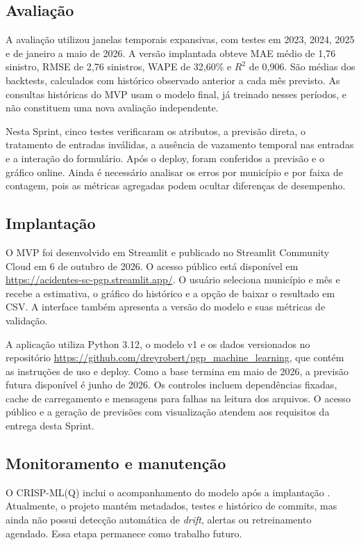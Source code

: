 \documentclass[12pt]{article}
\begin{document}
\subsection{Avaliação}

A avaliação utilizou janelas temporais expansivas, com testes em 2023, 2024, 2025 e de janeiro a maio de 2026. A versão implantada obteve MAE médio de 1,76 sinistro, RMSE de 2,76 sinistros, WAPE de 32,60\% e $R^2$ de 0,906. São médias dos backtests, calculados com histórico observado anterior a cada mês previsto. As consultas históricas do MVP usam o modelo final, já treinado nesses períodos, e não constituem uma nova avaliação independente.

Nesta Sprint, cinco testes verificaram os atributos, a previsão direta, o tratamento de entradas inválidas, a ausência de vazamento temporal nas entradas e a interação do formulário. Após o deploy, foram conferidos a previsão e o gráfico online. Ainda é necessário analisar os erros por município e por faixa de contagem, pois as métricas agregadas podem ocultar diferenças de desempenho.

\subsection{Implantação}

O MVP foi desenvolvido em Streamlit e publicado no Streamlit Community Cloud em 6 de outubro de 2026. O acesso público está disponível em \url{https://acidentes-sc-pgp.streamlit.app/}. O usuário seleciona município e mês e recebe a estimativa, o gráfico do histórico e a opção de baixar o resultado em CSV. A interface também apresenta a versão do modelo e suas métricas de validação.

A aplicação utiliza Python 3.12, o modelo v1 e os dados versionados no repositório \url{https://github.com/dreyrobert/pgp_machine_learning}, que contém as instruções de uso e deploy. Como a base termina em maio de 2026, a previsão futura disponível é junho de 2026. Os controles incluem dependências fixadas, cache de carregamento e mensagens para falhas na leitura dos arquivos. O acesso público e a geração de previsões com visualização atendem aos requisitos da entrega desta Sprint.

\subsection{Monitoramento e manutenção}

O CRISP-ML(Q) inclui o acompanhamento do modelo após a implantação \cite{studer2021crispmlq}. Atualmente, o projeto mantém metadados, testes e histórico de commits, mas ainda não possui detecção automática de \textit{drift}, alertas ou retreinamento agendado. Essa etapa permanece como trabalho futuro.
\end{document}
